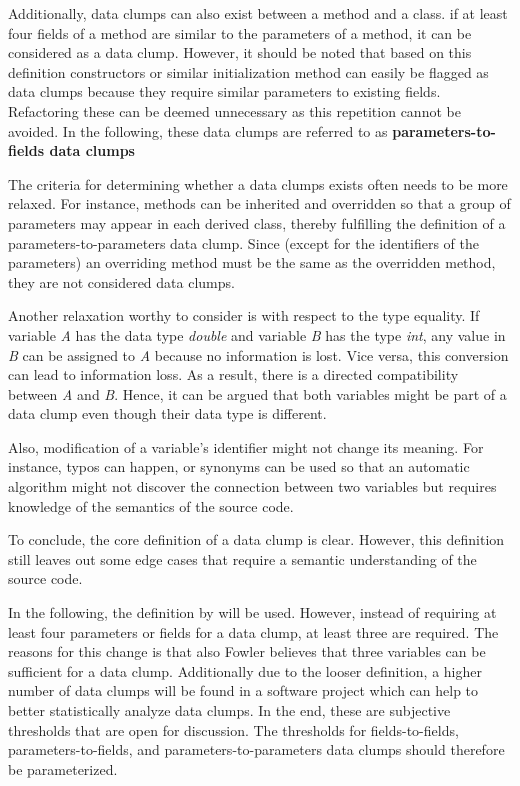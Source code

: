 Additionally, data clumps can also exist between a method and a class. if at least four fields of a method are similar to the parameters of a method, it can be considered as a data clump. However, it should be noted that based on this definition constructors or similar initialization method can easily be flagged as data clumps because they require similar parameters to existing fields. Refactoring these can be deemed unnecessary as this repetition cannot be avoided. 
 In the following, these data clumps are referred to as \textbf{parameters-to-fields data clumps}


The criteria for determining whether a data clumps exists often needs to be more relaxed. For instance, methods can be inherited and overridden so that a group of parameters may appear in each derived class, thereby fulfilling the definition of a  parameters-to-parameters data clump. Since (except for the identifiers of the parameters) an overriding method must be the same as the overridden method, they are not considered data clumps.


Another relaxation worthy to consider is with respect to the type equality. If variable \textit{A} has the data type \textit{double} and variable \textit{B} has the type \textit{int}, any value in \textit{B} can be assigned to \textit{A} because no information is lost. Vice versa, this conversion can lead to information loss. As a result, there is a directed compatibility between \textit{A} and \textit{B}. Hence, it can be argued that both variables might be part of a data clump even though their data type is different. 


Also, modification of a variable's identifier might not change its meaning. For instance, typos can happen, or synonyms can be used so that an automatic algorithm might not discover the connection between two variables but requires knowledge of the semantics of the source code. \cite{zhangImprovingPrecisionFowler2008}



To conclude, the core definition of a data clump is clear. However, this definition still leaves out some edge cases that require a semantic understanding of the source code. 



In the following, the definition by \cite{zhangImprovingPrecisionFowler2008} will be used. However,  instead of requiring at least four parameters or fields for a data clump, at least three are required. The reasons for this change is that also Fowler believes that three variables can be sufficient for a data clump. Additionally due to the looser definition, a higher number of data clumps will be found in a software project which can help to better statistically analyze data clumps. In the end, these are subjective thresholds that are open for discussion. The thresholds for fields-to-fields, parameters-to-fields, and parameters-to-parameters data clumps should therefore be parameterized.



